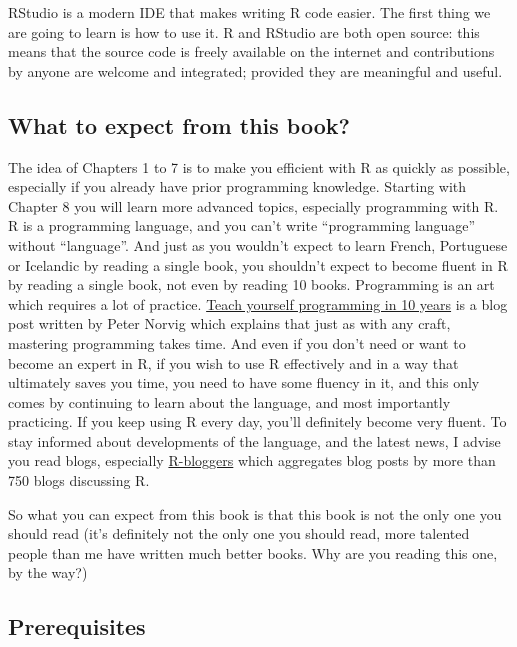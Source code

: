 \documentclass[]{gitbook}
\theoremstyle{definition}
\theoremstyle{definition}
\theoremstyle{definition}
\theoremstyle{remark}
\begin{document}
RStudio is a modern IDE that makes writing R code easier. The first
thing we are going to learn is how to use it. R and RStudio are both
open source: this means that the source code is freely available on the
internet and contributions by anyone are welcome and integrated;
provided they are meaningful and useful.

\hypertarget{what-to-expect-from-this-book}{%
\subsection*{What to expect from this
book?}\label{what-to-expect-from-this-book}}

The idea of Chapters 1 to 7 is to make you efficient with R as quickly
as possible, especially if you already have prior programming knowledge.
Starting with Chapter 8 you will learn more advanced topics, especially
programming with R. R is a programming language, and you can't write
``programming language'' without ``language''. And just as you wouldn't
expect to learn French, Portuguese or Icelandic by reading a single
book, you shouldn't expect to become fluent in R by reading a single
book, not even by reading 10 books. Programming is an art which requires
a lot of practice. \href{http://www.norvig.com/21-days.html}{Teach
yourself programming in 10 years} is a blog post written by Peter Norvig
which explains that just as with any craft, mastering programming takes
time. And even if you don't need or want to become an expert in R, if
you wish to use R effectively and in a way that ultimately saves you
time, you need to have some fluency in it, and this only comes by
continuing to learn about the language, and most importantly practicing.
If you keep using R every day, you'll definitely become very fluent. To
stay informed about developments of the language, and the latest news, I
advise you read blogs, especially
\href{https://www.r-bloggers.com/}{R-bloggers} which aggregates blog
posts by more than 750 blogs discussing R.

So what you can expect from this book is that this book is not the only
one you should read (it's definitely not the only one you should read,
more talented people than me have written much better books. Why are you
reading this one, by the way?)

\hypertarget{prerequisites}{%
\subsection*{Prerequisites}\label{prerequisites}}
\end{document}
